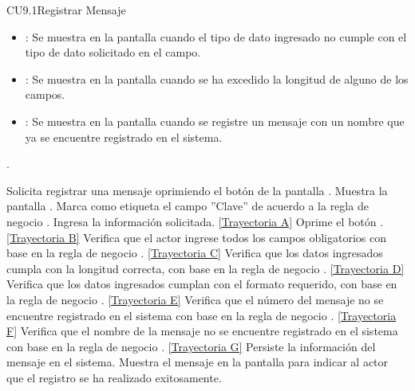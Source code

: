 \begin{UseCase}{CU9.1}{Registrar Mensaje}
{\begin{itemize}
		\item {}: Se muestra en la pantalla  cuando el tipo de dato ingresado no cumple con el tipo de dato solicitado en el campo.
		\item {}: Se muestra en la pantalla  cuando se ha excedido la longitud de alguno de los campos.
		\item {}: Se muestra en la pantalla  cuando se registre un mensaje con un nombre que ya se encuentre registrado en el sistema.
		\end{itemize}.
		}
	\end{UseCase}
	\begin{UCtrayectoria}
		\UCpaso[\UCactor] Solicita registrar una mensaje oprimiendo el botón  de la pantalla .
		\UCpaso[\UCsist] Muestra la pantalla .
		\UCpaso[\UCsist] Marca como etiqueta el campo ''Clave'' de acuerdo a la regla de negocio .
		\UCpaso[\UCactor] Ingresa la información solicitada. \label{CU9.1-P3} \hyperlink{CU9-1:TAA}{[Trayectoria A]}
		\UCpaso[\UCactor] Oprime el botón  . \label{CU9.1-P4} \hyperlink{CU9-1:TAB}{[Trayectoria B]} 
		\UCpaso[\UCsist] Verifica que el actor ingrese todos los campos obligatorios con base en la regla de negocio . \hyperlink{CU9-1:TAC}{[Trayectoria C]}
		\UCpaso[\UCsist] Verifica que los datos ingresados cumpla con la longitud correcta, con base en la regla de negocio . \hyperlink{CU9-1:TAD}{[Trayectoria D]}
		\UCpaso[\UCsist] Verifica que los datos ingresados cumplan con el formato requerido, con base en la regla de negocio . \hyperlink{CU9-1:TAE}{[Trayectoria E]}
		\UCpaso[\UCsist] Verifica que el número del mensaje no se encuentre registrado en el sistema con base en la regla de negocio . \hyperlink{CU9-1:TAF}{[Trayectoria F]}
		\UCpaso[\UCsist] Verifica que el nombre de la mensaje no se encuentre registrado en el sistema con base en la regla de negocio . \hyperlink{CU9-1:TAG}{[Trayectoria G]} 
		\UCpaso[\UCsist] Persiste la información del mensaje en el sistema.
		\UCpaso[\UCsist] Muestra el mensaje  en la pantalla  para indicar al actor que el registro se ha realizado exitosamente.
	\end{UCtrayectoria}		
